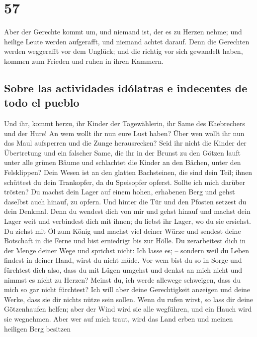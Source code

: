 \hypertarget{section-56}{%
\section{57}\label{section-56}}

 Aber der Gerechte kommt um, und niemand ist, der es zu
Herzen nehme; und heilige Leute werden aufgerafft, und niemand achtet
darauf. Denn die Gerechten werden weggerafft vor dem Unglück;
 und die richtig vor sich gewandelt haben, kommen zum
Frieden und ruhen in ihren Kammern.

\hypertarget{sobre-las-actividades-iduxf3latras-e-indecentes-de-todo-el-pueblo}{%
\subsection{Sobre las actividades idólatras e indecentes de todo el
pueblo}\label{sobre-las-actividades-iduxf3latras-e-indecentes-de-todo-el-pueblo}}

 Und ihr, kommt herzu, ihr Kinder der Tagewählerin, ihr
Same des Ehebrechers und der Hure!  An wem wollt ihr nun
eure Lust haben? Über wen wollt ihr nun das Maul aufsperren und die
Zunge herausrecken? Seid ihr nicht die Kinder der Übertretung und ein
falscher Same,  die ihr in der Brunst zu den Götzen lauft
unter alle grünen Bäume und schlachtet die Kinder an den Bächen, unter
den Felsklippen?  Dein Wesen ist an den glatten
Bachsteinen, die sind dein Teil; ihnen schüttest du dein Trankopfer, da
du Speisopfer opferst. Sollte ich mich darüber trösten? 
Du machst dein Lager auf einem hohen, erhabenen Berg und gehst daselbst
auch hinauf, zu opfern.  Und hinter die Tür und den
Pfosten setzest du dein Denkmal. Denn du wendest dich von mir und gehst
hinauf und machst dein Lager weit und verbindest dich mit ihnen; du
liebst ihr Lager, wo du sie ersiehst.  Du ziehst mit Öl
zum König und machst viel deiner Würze und sendest deine Botschaft in
die Ferne und bist erniedrigt bis zur Hölle.  Du
zerarbeitest dich in der Menge deiner Wege und sprichst nicht: Ich lasse
es; -- sondern weil du Leben findest in deiner Hand, wirst du nicht
müde.  Vor wem bist du so in Sorge und fürchtest dich
also, dass du mit Lügen umgehst und denkst an mich nicht und nimmst es
nicht zu Herzen? Meinst du, ich werde allewege schweigen, dass du mich
so gar nicht fürchtest?  Ich will aber deine
Gerechtigkeit anzeigen und deine Werke, dass sie dir nichts nütze sein
sollen.  Wenn du rufen wirst, so lass dir deine
Götzenhaufen helfen; aber der Wind wird sie alle wegführen, und ein
Hauch wird sie wegnehmen. Aber wer auf mich traut, wird das Land erben
und meinen heiligen Berg besitzen

